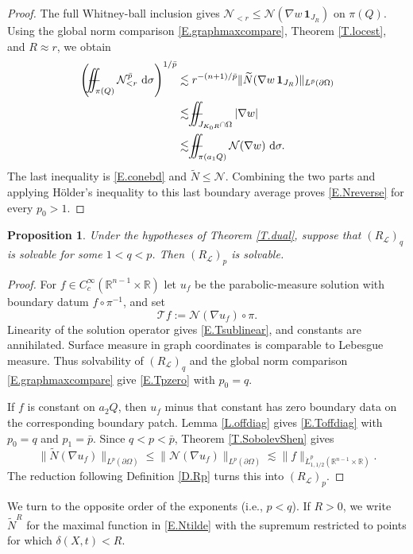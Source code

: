 \documentclass[12pt,leqno]{amsart}
\numberwithin{equation}{section}
\newcommand{\R}{\mathbb R}
\newcommand{\om}{\Omega}
\newcommand{\pom}{\partial\Omega}
\newcommand{\LL}{\mathcal L}
\newcommand{\Nt}{\widetilde N}
\renewcommand{\d}{\,\mathrm d}
\def\Yint#1{\mathchoice
	{\YYint\displaystyle\textstyle{#1}}%
	{\YYint\textstyle\scriptstyle{#1}}%
	{\YYint\scriptstyle\scriptscriptstyle{#1}}%
	{\YYint\scriptscriptstyle\scriptscriptstyle{#1}}%
	\!\dint}
\newcommand{\dint}{\int\!\!\!\!\!\int}
\def\YYint#1#2#3{{\setbox0=\hbox{$#1{#2#3}{\iint}$}
		\vcenter{\hbox{$#2#3$}}\kern-.51\wd0}}
\def\longdash{\mkern-1.5mu{-}\mkern-7.5mu{-}}
\def\fiint{\Yint\longdash}
\theoremstyle{plain}
\newtheorem{proposition}[equation]{Proposition}
\theoremstyle{remark}
\begin{document}
\begin{proof}
The full Whitney-ball inclusion gives
$\mathcal N_{<r}\le\mathcal N(\nabla w\,\mathbf1_{J_R})$ on $\pi(Q)$.
Using the global norm comparison \eqref{E.graphmaxcompare}, Theorem
\ref{T.locest}, and $R\approx r$, we obtain
\begin{align*}
 \left(\fiint_{\pi(Q)}\mathcal N_{<r}^{\bar p}\,\d\sigma\right)^{1/\bar p}
 &\lesssim r^{-(n+1)/\bar p}
      \|\Nt(\nabla w\,\mathbf1_{J_R})\|_{L^{\bar p}(\pom)}\\
 &\lesssim\fiint_{J_{K_0R}\cap\om}|\nabla w|\\
 &\lesssim\fiint_{\pi(a_1Q)}\mathcal N(\nabla w)\,\d\sigma.
\end{align*}
The last inequality is \eqref{E.conebd} and $\Nt\le\mathcal N$.
Combining the two parts and applying H\"older's inequality to this last
boundary average proves \eqref{E.Nreverse} for every $p_0>1$.
\end{proof}

\begin{proposition}\label{P.dualqp}
Under the hypotheses of Theorem \ref{T.dual}, suppose that $(R_{\LL})_q$ is
solvable for some $1<q<p$. Then $(R_{\LL})_p$ is solvable.
\end{proposition}

\begin{proof}
For $f\in C_c^\infty(\R^{n-1}\times\R)$ let $u_f$ be the parabolic-measure
solution with boundary datum $f\circ\pi^{-1}$, and set
\[
 \mathcal Tf:=\mathcal N(\nabla u_f)\circ\pi.
\]
Linearity of the solution operator gives \eqref{E.Tsublinear}, and constants
are annihilated. Surface measure in graph coordinates is comparable to
Lebesgue measure. Thus solvability of $(R_{\LL})_q$ and the global norm
comparison \eqref{E.graphmaxcompare} give \eqref{E.Tpzero} with $p_0=q$.

If $f$ is constant on $a_2Q$, then $u_f$ minus that constant has zero boundary
data on the corresponding boundary patch. Lemma \ref{L.offdiag} gives
\eqref{E.Toffdiag} with $p_0=q$ and $p_1=\bar p$. Since
$q<p<\bar p$, Theorem \ref{T.SobolevShen} gives
\[
 \|\Nt(\nabla u_f)\|_{L^p(\pom)}
 \le\|\mathcal N(\nabla u_f)\|_{L^p(\pom)}
 \lesssim\|f\|_{\dot L^p_{1,1/2}(\R^{n-1}\times\R)}.
\]
The reduction following Definition \ref{D.Rp} turns this into $(R_{\LL})_p$.
\end{proof}

We turn to the opposite order of the exponents (i.e., $p<q$). If $R>0$, we write $\Nt^R$
for the maximal function in \eqref{E.Ntilde} with the supremum restricted to
points for which $\delta(X,t)<R$.
\end{document}

